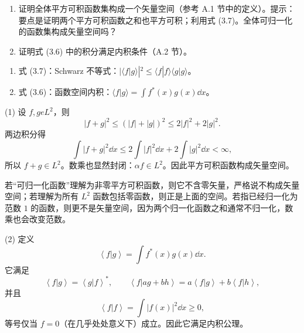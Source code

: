 \begin{question}
\begin{enumerate}
\item 证明全体平方可积函数集构成一个矢量空间（参考 A.1 节中的定义）。提示：要点是证明两个平方可积函数之和也平方可积；利用式 (3.7)。全体可归一化的函数集构成矢量空间吗？
\item 证明式 (3.6) 中的积分满足内积条件（A.2 节）。
\end{enumerate}

\par\smallskip
{}
\begin{enumerate}[leftmargin=2.2em,itemsep=0.12em,topsep=0.12em,parsep=0pt]
\item 式 (3.7)：Schwarz 不等式：$|\langle f|g\rangle|^2\le \langle f|f\rangle\langle g|g\rangle$。
\item 式 (3.6)：函数空间内积：$\langle f|g\rangle=\int f^*(x)g(x)\dd x$。
\end{enumerate}

\end{question}
\begin{solution}
(1) 设 $f,g
e L^2$，则
\[
|f+g|^2\le (|f|+|g|)^2\le 2|f|^2+2|g|^2 .
\]
两边积分得
\[
\int |f+g|^2\dd x\le 2\int |f|^2\dd x+2\int |g|^2\dd x<\infty,
\]
所以 $f+g\in L^2$。数乘也显然封闭：$\alpha f\in L^2$。因此平方可积函数构成矢量空间。

若“可归一化函数”理解为非零平方可积函数，则它不含零矢量，严格说不构成矢量空间；若理解为所有 $L^2$ 函数包括零函数，则正是上面的空间。若指已经归一化为范数 $1$ 的函数，则更不是矢量空间，因为两个归一化函数之和通常不归一化，数乘也会改变范数。

(2) 定义
\[
\left\langle f|g \right\rangle=\int f^*(x)g(x)\dd x .
\]
它满足
\[
\left\langle f|g \right\rangle=\left\langle g|f \right\rangle^*,\qquad
\left\langle f|ag+bh \right\rangle=a\left\langle f|g \right\rangle+b\left\langle f|h \right\rangle,
\]
并且
\[
\left\langle f|f \right\rangle=\int |f(x)|^2\dd x\ge 0,
\]
等号仅当 $f=0$（在几乎处处意义下）成立。因此它满足内积公理。
\end{solution}

